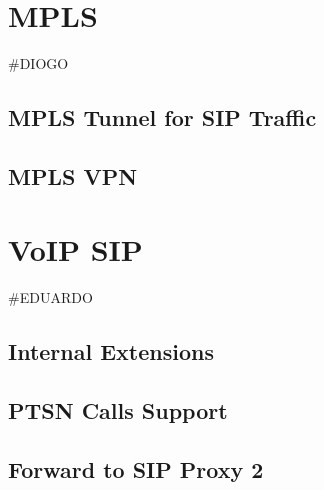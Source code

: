 \documentclass[11pt,a4paper]{report}
\begin{document}
\chapter{MPLS}
\#DIOGO
\section{MPLS Tunnel for SIP Traffic}
\section{MPLS VPN}


\chapter{VoIP SIP}
\#EDUARDO
\section{Internal Extensions}
\section{PTSN Calls Support}
\section{Forward to SIP Proxy 2}



\end{document}
